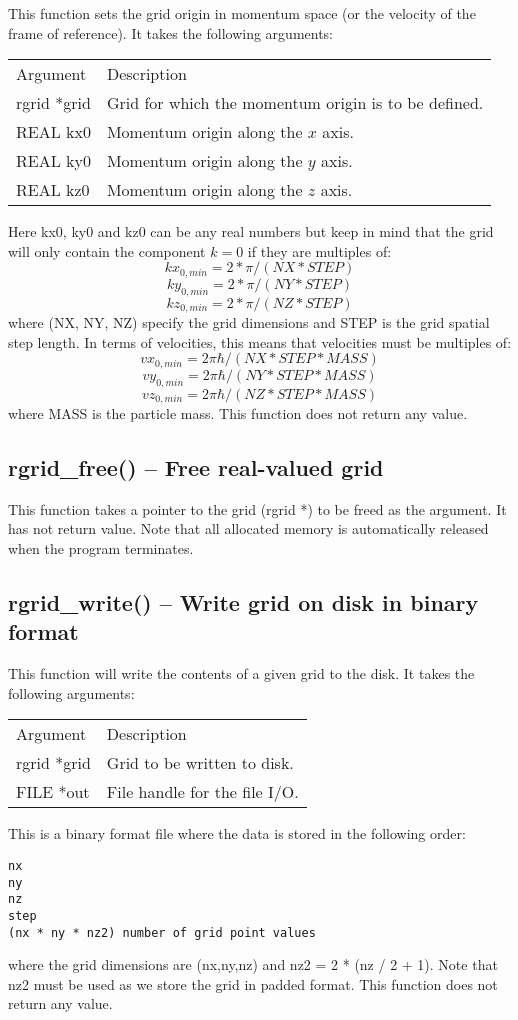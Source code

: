 \documentclass[12pt,letterpaper]{report}
\begin{document}
This function sets the grid origin in momentum space (or the velocity of the frame of reference). It takes the following arguments:
\begin{longtable}{p{} p{}}
Argument & Description\\
\cline{1-2}
rgrid *grid & Grid for which the momentum origin is to be defined.\\
REAL kx0 & Momentum origin along the $x$ axis.\\
REAL ky0 & Momentum origin along the $y$ axis.\\
REAL kz0 & Momentum origin along the $z$ axis.\\
\end{longtable}
\noindent
Here kx0, ky0 and kz0 can be any real numbers but keep in mind that the grid will only contain the component $k = 0$ if they are multiples of:
$$kx_{0,min} = 2 * \pi / (NX * STEP)$$
$$ky_{0,min} = 2 * \pi / (NY * STEP)$$
$$kz_{0,min} = 2 * \pi / (NZ * STEP)$$
\noindent
where (NX, NY, NZ) specify the grid dimensions and STEP is the grid spatial step length. In terms of velocities, this means that velocities must be multiples of:
$$vx_{0,min} = 2\pi\hbar / (NX * STEP * MASS)$$
$$vy_{0,min} = 2\pi\hbar / (NY * STEP * MASS)$$
$$vz_{0,min} = 2\pi\hbar / (NZ * STEP * MASS)$$
where MASS is the particle mass. This function does not return any value.

\subsection{rgrid\_free() -- Free real-valued grid}

This function takes a pointer to the grid (rgrid *) to be freed as the argument. It has not return value. Note that all allocated memory is automatically released when the program terminates.

\subsection{rgrid\_write() -- Write grid on disk in binary format}

This function will write the contents of a given grid to the disk. It takes the following arguments:
\begin{longtable}{p{} p{}}
Argument & Description\\
\cline{1-2}
rgrid *grid & Grid to be written to disk.\\
FILE *out & File handle for the file I/O.\\
\end{longtable}
\noindent
This is a binary format file where the data is stored in the following order:
\begin{verbatim}
nx
ny
nz
step
(nx * ny * nz2) number of grid point values
\end{verbatim}
where the grid dimensions are (nx,ny,nz) and nz2 = 2 * (nz / 2 + 1). Note that nz2 must be used as we store the grid in padded format. This function does not return any value.
\end{document}
